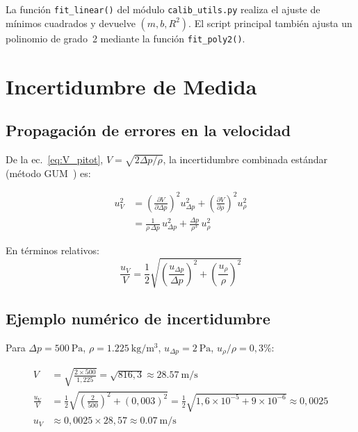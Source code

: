 \documentclass[12pt,a4paper]{article}
\begin{document}
La función \texttt{fit\_linear()} del módulo \texttt{calib\_utils.py} realiza
el ajuste de mínimos cuadrados y devuelve $(m, b, R^2)$.  El script principal
también ajusta un polinomio de grado~2 mediante la función
\texttt{fit\_poly2()}.

\section{Incertidumbre de Medida}
\label{sec:incertidumbre}

\subsection{Propagación de errores en la velocidad}

De la ec.~\eqref{eq:V_pitot}, $V = \sqrt{2\Delta p/\rho}$, la incertidumbre
combinada estándar (método GUM~\cite{gum2008}) es:

\begin{align}
	u_V^2 & = \left(\frac{\partial V}{\partial \Delta p}\right)^2 u_{\Delta p}^2
	+ \left(\frac{\partial V}{\partial \rho}\right)^2 u_\rho^2                   \\
	      & = \frac{1}{\rho\,\Delta p}\,u_{\Delta p}^2
	+ \frac{\Delta p}{\rho^3}\,u_\rho^2
	\label{eq:uV}
\end{align}

En términos relativos:
\begin{equation}
	\boxed{\frac{u_V}{V} = \frac{1}{2}\sqrt{
			\left(\frac{u_{\Delta p}}{\Delta p}\right)^2
			+ \left(\frac{u_\rho}{\rho}\right)^2}}
	\label{eq:uV_relativa}
\end{equation}

\subsection{Ejemplo numérico de incertidumbre}

Para $\Delta p = \SI{500}{\pascal}$, $\rho = \SI{1.225}{\kilogram\per\metre\cubed}$,
$u_{\Delta p} = \SI{2}{\pascal}$, $u_\rho / \rho = 0{,}3\%$:

\begin{align}
	V             & = \sqrt{\frac{2\times500}{1{,}225}} = \sqrt{816{,}3}
	\approx \SI{28.57}{\metre\per\second}                                                \\
	\frac{u_V}{V} & = \frac{1}{2}\sqrt{\left(\frac{2}{500}\right)^2
		+ (0{,}003)^2}
	= \frac{1}{2}\sqrt{1{,}6\times10^{-5} + 9\times10^{-6}}
	\approx 0{,}0025                                                                     \\
	u_V           & \approx 0{,}0025 \times 28{,}57 \approx \SI{0.07}{\metre\per\second}
	\label{eq:uV_ejemplo}
\end{align}
\end{document}

